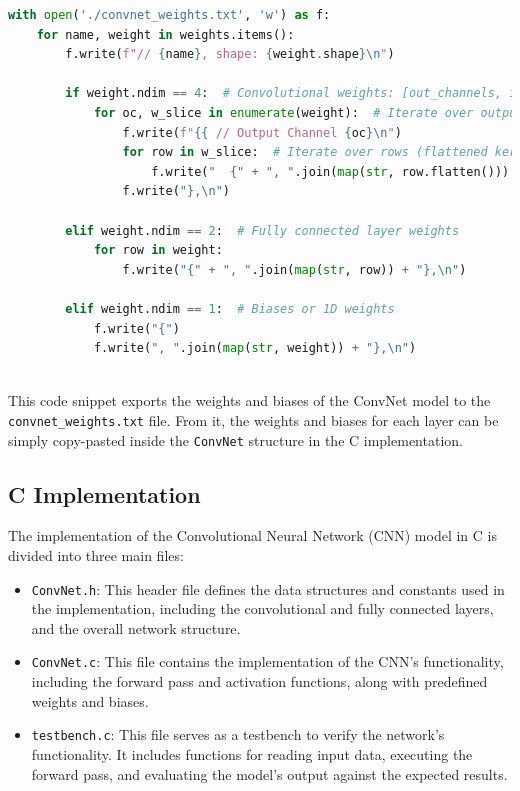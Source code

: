 \documentclass{article}
\begin{document}
\begin{lstlisting}[language=Python]
with open('./convnet_weights.txt', 'w') as f:
    for name, weight in weights.items():
        f.write(f"// {name}, shape: {weight.shape}\n")
        
        if weight.ndim == 4:  # Convolutional weights: [out_channels, in_channels, kernel_height, kernel_width]
            for oc, w_slice in enumerate(weight):  # Iterate over output channels
                f.write(f"{{ // Output Channel {oc}\n")
                for row in w_slice:  # Iterate over rows (flattened kernels)
                    f.write("  {" + ", ".join(map(str, row.flatten())) + "},\n")
                f.write("},\n")
        
        elif weight.ndim == 2:  # Fully connected layer weights
            for row in weight:
                f.write("{" + ", ".join(map(str, row)) + "},\n")
        
        elif weight.ndim == 1:  # Biases or 1D weights
            f.write("{")
            f.write(", ".join(map(str, weight)) + "},\n")
    
\end{lstlisting}

This code snippet exports the weights and biases of the ConvNet model to the \texttt{convnet\_weights.txt} file. From it, the weights and biases for each layer can be simply copy-pasted inside the \texttt{ConvNet} structure in the C implementation. 

\subsection{C Implementation}
The implementation of the Convolutional Neural Network (CNN) model in C is divided into three main files:

\begin{itemize}
    \item \texttt{ConvNet.h}: This header file defines the data structures and constants used in the implementation, including the convolutional and fully connected layers, and the overall network structure.
    \item \texttt{ConvNet.c}: This file contains the implementation of the CNN's functionality, including the forward pass and activation functions, along with predefined weights and biases.
    \item \texttt{testbench.c}: This file serves as a testbench to verify the network's functionality. It includes functions for reading input data, executing the forward pass, and evaluating the model's output against the expected results.
\end{itemize}
\end{document}
